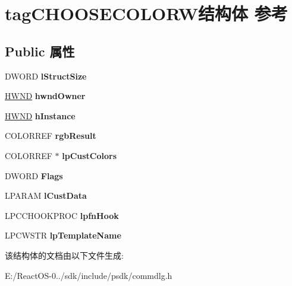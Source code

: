\hypertarget{structtag_c_h_o_o_s_e_c_o_l_o_r_w}{}\section{tag\+C\+H\+O\+O\+S\+E\+C\+O\+L\+O\+R\+W结构体 参考}
\label{structtag_c_h_o_o_s_e_c_o_l_o_r_w}
\subsection*{Public 属性}
\begin{DoxyCompactItemize}
\item 
\mbox{\label{structtag_c_h_o_o_s_e_c_o_l_o_r_w_aaaa0f80488546de112f2255766e61098}} 
D\+W\+O\+RD {\bfseries l\+Struct\+Size}
\item 
\mbox{\label{structtag_c_h_o_o_s_e_c_o_l_o_r_w_a76f70c12e0725cd1bccf3869c051c3b9}} 
\hyperlink{interfacevoid}{H\+W\+ND} {\bfseries hwnd\+Owner}
\item 
\mbox{\label{structtag_c_h_o_o_s_e_c_o_l_o_r_w_a60e85198f2766710dda294ed440ca60d}} 
\hyperlink{interfacevoid}{H\+W\+ND} {\bfseries h\+Instance}
\item 
\mbox{\label{structtag_c_h_o_o_s_e_c_o_l_o_r_w_ac0847817a4afd18054df835bafab9ba1}} 
C\+O\+L\+O\+R\+R\+EF {\bfseries rgb\+Result}
\item 
\mbox{\label{structtag_c_h_o_o_s_e_c_o_l_o_r_w_aa147baad2f02f097293eec44a31d8dd9}} 
C\+O\+L\+O\+R\+R\+EF $\ast$ {\bfseries lp\+Cust\+Colors}
\item 
\mbox{\label{structtag_c_h_o_o_s_e_c_o_l_o_r_w_a12530d7918299fed2d9ccee62addabad}} 
D\+W\+O\+RD {\bfseries Flags}
\item 
\mbox{\label{structtag_c_h_o_o_s_e_c_o_l_o_r_w_a9aedb18f0411943494f58b6adabe834a}} 
L\+P\+A\+R\+AM {\bfseries l\+Cust\+Data}
\item 
\mbox{\label{structtag_c_h_o_o_s_e_c_o_l_o_r_w_a9a7a9a3d1adce5ab41d284bf3fa7c287}} 
L\+P\+C\+C\+H\+O\+O\+K\+P\+R\+OC {\bfseries lpfn\+Hook}
\item 
\mbox{\label{structtag_c_h_o_o_s_e_c_o_l_o_r_w_ada3b98b4bd866ffaa3c59f9af6465f9c}} 
L\+P\+C\+W\+S\+TR {\bfseries lp\+Template\+Name}
\end{DoxyCompactItemize}


该结构体的文档由以下文件生成\+:\begin{DoxyCompactItemize}
\item 
E\+:/\+React\+O\+S-\/0../sdk/include/psdk/commdlg.\+h\end{DoxyCompactItemize}
